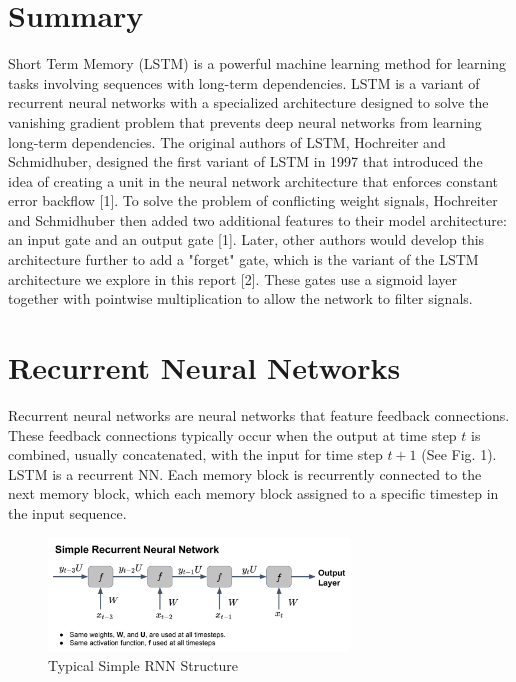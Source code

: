 \documentclass[journal]{IEEEtran}
\begin{document}
\section{Summary}
%
 Short Term Memory (LSTM) is a powerful machine learning method
for learning tasks involving sequences with long-term dependencies. LSTM is a variant
of recurrent neural networks with a specialized architecture designed to solve the
vanishing gradient problem that prevents deep neural networks from learning long-term dependencies.
The original authors of LSTM, Hochreiter and Schmidhuber, designed the first variant of LSTM in 1997 that introduced
the idea of creating a unit in the neural network architecture that enforces constant error backflow [1]. To solve
the problem of conflicting weight signals, Hochreiter and Schmidhuber then added two additional features to their
model architecture: an input gate and an output gate [1]. Later, other authors would develop this architecture further
to add a "forget" gate, which is the variant of the LSTM architecture we explore in this report [2]. These gates use
a sigmoid layer together with pointwise multiplication to allow the network to filter signals.
\\


\section{Recurrent Neural Networks}
Recurrent neural networks are neural networks that feature
feedback connections. These feedback connections typically occur when the output at time step $t$
is combined, usually concatenated, with the input for time step $t+1$ (See Fig. 1). LSTM
is a recurrent NN. Each memory block is recurrently connected to the next memory block,
which each memory block assigned to a specific timestep in the input sequence.

\begin{figure}[h]
  \centering
  \includegraphics[width=8cm]{RNN Illustration.png}
  \caption{Typical Simple RNN Structure}
\end{figure}
\end{document}
